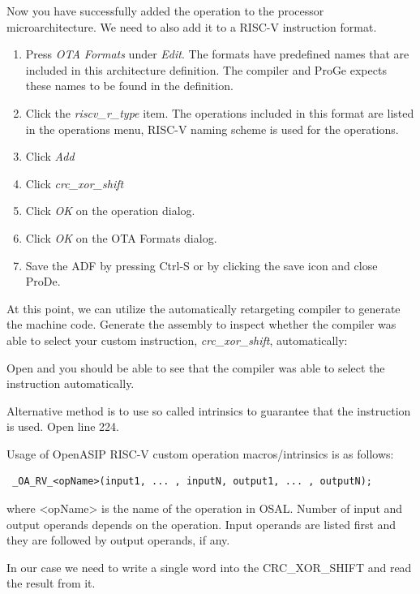 \documentclass[a4paper,twoside]{tceusermanual}
\begin{document}
Now you have successfully added the operation to the processor
microarchitecture. We need to also add it to a RISC-V instruction
format.

\begin{enumerate}
  \item%
    Press \emph{OTA Formats} under \emph{Edit}.
    The formats have predefined names that are included in this
    architecture definition. The compiler and ProGe expects these names to be 
    found in the definition. 
  \item%
    Click the \emph{riscv\_r\_type} item.
    The operations included in this format are listed in the operations menu,
    RISC-V naming scheme is used for the operations.
  \item%
    Click \emph{Add}
  \item%
    Click \emph{crc\_xor\_shift}
  \item%
    Click \emph{OK} on the operation dialog.
  \item%
    Click \emph{OK} on the OTA Formats dialog.
  \item%
    Save the ADF by pressing Ctrl-S or by clicking the save icon and close ProDe.
\end{enumerate}

At this point, we can utilize the automatically retargeting compiler to generate the machine code.
Generate the assembly to inspect whether the compiler was able to select your custom instruction,
\emph{crc\_xor\_shift}, automatically:


Open  and you should be able to see that the compiler was able to select
the instruction automatically.


Alternative method is to use so called intrinsics to guarantee that the instruction is used.
Open  line 224.

Usage of OpenASIP RISC-V custom operation macros/intrinsics is as follows:

\begin{verbatim}
 _OA_RV_<opName>(input1, ... , inputN, output1, ... , outputN);
\end{verbatim}

where <opName> is the name of the operation in OSAL. Number of input and
output operands depends on the operation. Input operands are listed first
and they are followed by output operands, if any.

In our case we need to write a single word into the CRC\_XOR\_SHIFT and read the
result from it.
\end{document}
